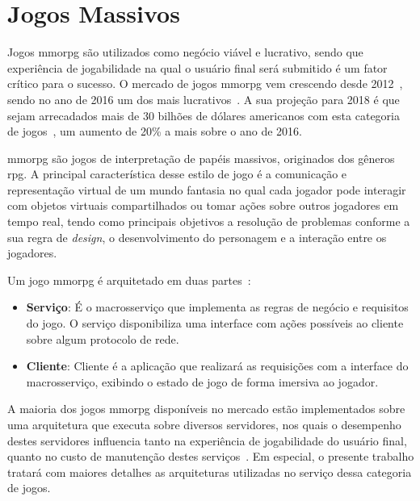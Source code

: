 \section{Jogos Massivos}
\label{sec:mmorpg}



Jogos \ac{mmorpg} são utilizados como negócio viável e lucrativo, sendo que experiência de jogabilidade na qual o usuário final será submitido é um fator crítico para o sucesso.
%
O mercado de jogos \ac{mmorpg} vem crescendo desde 2012~\cite{new_york_times}, sendo no ano de 2016 um dos mais lucrativos~\cite{statista_2016}.
%
A sua projeção para 2018 é que sejam arrecadados mais de 30 bilhões de dólares americanos com esta categoria de jogos~\cite{statista_2018}, um aumento de 20\% a mais sobre o ano de 2016.



\ac{mmorpg} são jogos de interpretação de papéis massivos, originados dos gêneros \ac{rpg}.
%
A principal característica desse estilo de jogo é a comunicação e representação virtual de um mundo fantasia no qual cada jogador pode interagir com objetos virtuais compartilhados ou tomar ações sobre outros jogadores em tempo real, tendo como principais objetivos a resolução de problemas conforme a sua regra de \textit{design}, o desenvolvimento do personagem e a interação entre os jogadores\cite{video_game_technologies}.
%

Um jogo \ac{mmorpg} é arquitetado em duas partes~\cite{mmo_analytic}:
\begin{itemize}
  \item \textbf{Serviço}: É o macrosserviço que implementa as regras de negócio e requisitos do jogo.
  O serviço disponibiliza uma interface com ações possíveis ao cliente sobre algum protocolo de rede.
  \item \textbf{Cliente}: Cliente é a aplicação que realizará as requisições com a interface do macrosserviço, exibindo o estado de jogo de forma imersiva ao jogador.
\end{itemize}



A maioria dos jogos \ac{mmorpg} disponíveis no mercado estão implementados sobre uma arquitetura que executa sobre diversos servidores\cite{stephenclarkewillson2017}, nos quais o desempenho destes servidores influencia tanto na experiência de jogabilidade do usuário final, quanto no custo de manutenção destes serviços~\cite{1417630}.
%
Em especial, o presente trabalho tratará com maiores detalhes as arquiteturas utilizadas no serviço dessa categoria de jogos.


